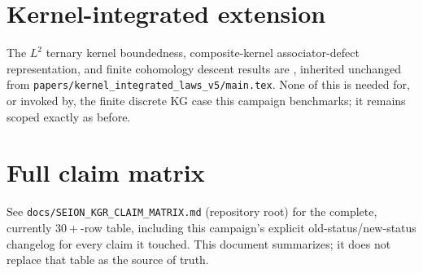 \documentclass[11pt]{article}
\begin{document}
\section{Kernel-integrated extension}
The $L^2$ ternary kernel boundedness, composite-kernel associator-defect representation, and
finite cohomology descent results are \textbf{\ProvedU}, inherited unchanged from
\texttt{papers/kernel\_integrated\_laws\_v5/main.tex}. None of this is needed for, or invoked by,
the finite discrete KG case this campaign benchmarks; it remains scoped exactly as before.

\section{Full claim matrix}
See \texttt{docs/SEION\_KGR\_CLAIM\_MATRIX.md} (repository root) for the complete, currently
$30+$-row table, including this campaign's explicit old-status/new-status changelog for every
claim it touched. This document summarizes; it does not replace that table as the source of truth.
\end{document}
